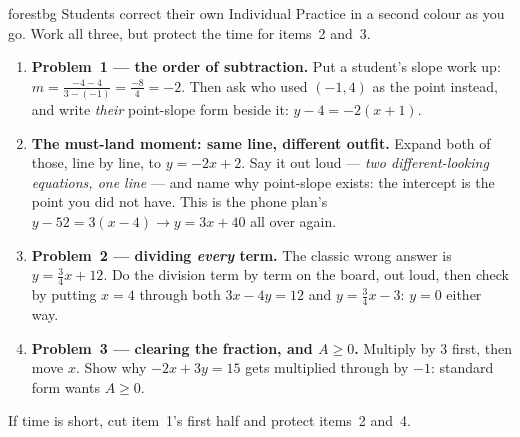 \documentclass[10pt]{article}
\begin{document}
\boxguard
\begin{skillbox}{forestbg}
Students correct their own Individual Practice in a second colour as you go. Work all three, but
protect the time for items~2 and~3.
\begin{enumerate}[leftmargin=1.3em, nosep, itemsep=2pt]
  \item \textbf{Problem~1 --- the order of subtraction.} Put a student's slope work up:
        $m=\frac{-4-4}{3-(-1)}=\frac{-8}{4}=-2$. Then ask who used $(-1,4)$ as the point instead,
        and write \emph{their} point-slope form beside it: $y-4=-2(x+1)$.
  \item \textbf{The must-land moment: same line, different outfit.} Expand both of those, line by
        line, to $y=-2x+2$. Say it out loud --- \emph{two different-looking equations, one line} ---
        and name why point-slope exists: the intercept is the point you did not have. This is the
        phone plan's $y-52=3(x-4) \to y=3x+40$ all over again.
  \item \textbf{Problem~2 --- dividing \emph{every} term.} The classic wrong answer is
        $y=\tfrac34x+12$. Do the division term by term on the board, out loud, then check by putting
        $x=4$ through both $3x-4y=12$ and $y=\tfrac34x-3$: $y=0$ either way.
  \item \textbf{Problem~3 --- clearing the fraction, and $A\ge0$.} Multiply by $3$ first, then move
        $x$. Show why $-2x+3y=15$ gets multiplied through by $-1$: standard form wants $A\ge0$.
\end{enumerate}
If time is short, cut item~1's first half and protect items~2 and~4.
\end{skillbox}
\end{document}
